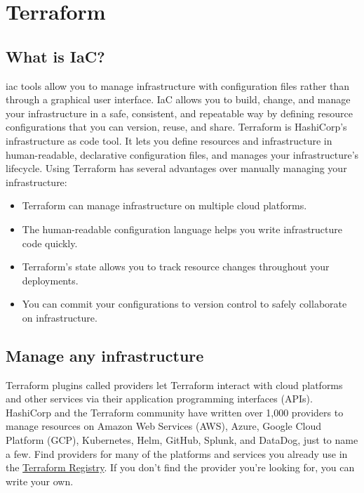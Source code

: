 \documentclass[../main.tex]{subfiles}
\begin{document}
\chapter{Terraform}
\section{What is IaC?}
\acrfull{iac} tools allow you to manage infrastructure with configuration files rather than through a graphical user interface.
IaC allows you to build, change, and manage your infrastructure in a safe, consistent, and repeatable way by defining resource configurations that you can version, reuse, and share.
Terraform is HashiCorp's infrastructure as code tool.
It lets you define resources and infrastructure in human-readable, declarative configuration files, and manages your infrastructure's lifecycle.
Using Terraform has several advantages over manually managing your infrastructure:
\begin{itemize}
  \item{Terraform can manage infrastructure on multiple cloud platforms.}
  \item{The human-readable configuration language helps you write infrastructure code quickly.}
  \item{Terraform's state allows you to track resource changes throughout your deployments.}
  \item{You can commit your configurations to version control to safely collaborate on infrastructure.}
\end{itemize}

\section{Manage any infrastructure}
Terraform plugins called providers let Terraform interact with cloud platforms and other services via their application programming interfaces (APIs).
HashiCorp and the Terraform community have written over 1,000 providers to manage resources on Amazon Web Services (AWS), Azure, Google Cloud Platform (GCP), Kubernetes, Helm, GitHub, Splunk, and DataDog, just to name a few.
Find providers for many of the platforms and services you already use in the \href{https://registry.terraform.io/browse/providers}{Terraform Registry}.
If you don't find the provider you're looking for, you can write your own.
\end{document}
